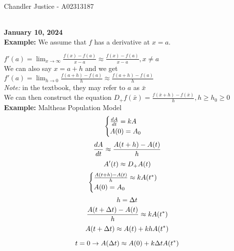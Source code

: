 \documentclass[10pt, AMS Euler]{article}
\begin{document}
\begin{flushright}
Chandler Justice - A02313187
\end{flushright}
\noindent \underline{\hspace{3in}}\\

\textbf{January 10, 2024}\\

\textbf{Example:} We assume that $f$ has a derivative at $x = a$.

$f'(a) = \lim_{x\to\infty} \frac{f(x) - f(a)}{x - a} \approx \frac{f(x) - f(a)}{x - a}, x \neq a$\\

We can also say $x = a + h$ and we get $f'(a) = \lim_{h \to 0} \frac{f(a + h) - f(a)}{h} \approx \frac{f(a + h) - f(a)}{h}$\\

\textit{Note:} in the textbook, they may refer to $a$ as $\bar{x}$\\

We can then construct the equation $D_+ f(\bar{x}) = \frac{f(\bar{x} + h) - f(\bar{x})}{h}, h \geq h_0 \geq 0$\\

\textbf{Example:} Maltheas Population Model\\

\[ 
    \begin{cases}
        \frac{dA}{dt} = kA\\
        A(0) = A_0\\
    \end{cases}\\
\]    
\[    
    \frac{dA}{dt} \approx \frac{A(t + h) - A(t)}{h}\\
\]
\[
    A'(t) \approx D_+ A(t)\\
\]   
    \[   
    \begin{cases}
        \frac{A(t + h) - A(t)}{h} \approx kA(t^*)\\
        A(0) = A_0
    \end{cases}\\
\] 
\[   
    h = \Delta t\\
\]    
\[
    \frac{A(t + \Delta t) - A(t)}{h} \approx kA(t^*)\\
\]    
\[    A(t + \Delta t) \approx A(t) + k h A(t^*)\\ \]
    
\[    t = 0 \rightarrow A(\Delta t) \approx A(0) + k \Delta t A(t^*)\\ \]
    
\end{document}
